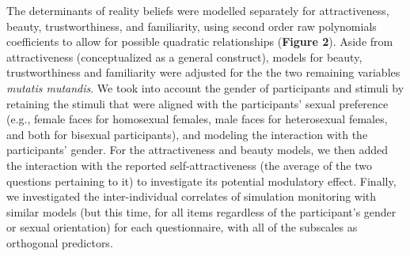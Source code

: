 \documentclass[
  man,floatsintext]{apa6}
\begin{document}
The determinants of reality beliefs were modelled separately for attractiveness, beauty, trustworthiness, and familiarity, using second order raw polynomials coefficients to allow for possible quadratic relationships (\textbf{Figure 2}). Aside from attractiveness (conceptualized as a general construct), models for beauty, trustworthiness and familiarity were adjusted for the the two remaining variables \emph{mutatis mutandis}. We took into account the gender of participants and stimuli by retaining the stimuli that were aligned with the participants' sexual preference (e.g., female faces for homosexual females, male faces for heterosexual females, and both for bisexual participants), and modeling the interaction with the participants' gender. For the attractiveness and beauty models, we then added the interaction with the reported self-attractiveness (the average of the two questions pertaining to it) to investigate its potential modulatory effect. Finally, we investigated the inter-individual correlates of simulation monitoring with similar models (but this time, for all items regardless of the participant's gender or sexual orientation) for each questionnaire, with all of the subscales as orthogonal predictors.
\end{document}
